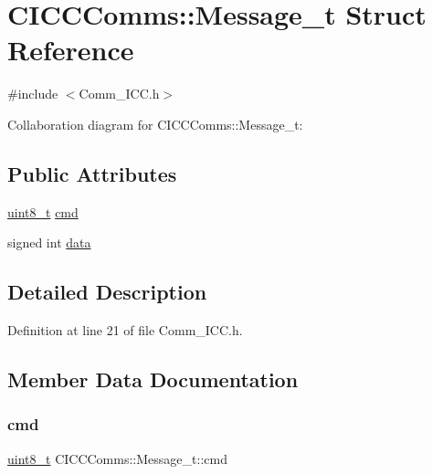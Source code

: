 \hypertarget{struct_c_i_c_c_comms_1_1_message__t}{}\section{C\+I\+C\+C\+Comms\+::Message\+\_\+t Struct Reference}
\label{struct_c_i_c_c_comms_1_1_message__t}


{\ttfamily \#include $<$Comm\+\_\+\+I\+C\+C.\+h$>$}



Collaboration diagram for C\+I\+C\+C\+Comms\+::Message\+\_\+t\+:
\subsection*{Public Attributes}
\begin{DoxyCompactItemize}
\item 
\mbox{\hyperlink{_a_d_a_s___types_8h_aba7bc1797add20fe3efdf37ced1182c5}{uint8\+\_\+t}} \mbox{\hyperlink{struct_c_i_c_c_comms_1_1_message__t_adf3e3290f54ee3997bc837463a340d05}{cmd}}
\item 
signed int \mbox{\hyperlink{struct_c_i_c_c_comms_1_1_message__t_a25cfce11e78d103524b695b281629d75}{data}}
\end{DoxyCompactItemize}


\subsection{Detailed Description}


Definition at line 21 of file Comm\+\_\+\+I\+C\+C.\+h.



\subsection{Member Data Documentation}
\mbox{\label{struct_c_i_c_c_comms_1_1_message__t_adf3e3290f54ee3997bc837463a340d05}} 
\subsubsection{\texorpdfstring{cmd}{cmd}}
{\footnotesize\ttfamily \mbox{\hyperlink{_a_d_a_s___types_8h_aba7bc1797add20fe3efdf37ced1182c5}{uint8\+\_\+t}} C\+I\+C\+C\+Comms\+::\+Message\+\_\+t\+::cmd}



